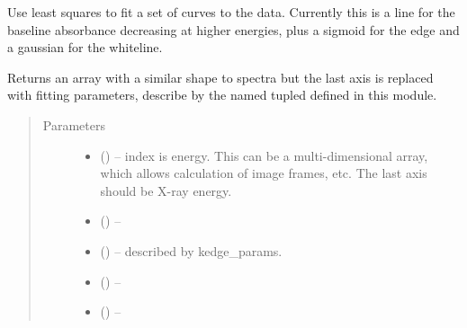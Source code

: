 \documentclass[letterpaper,10pt,english]{sphinxmanual}
\begin{document}
\begin{fulllineitems}
\label{\detokenize{xanespy:xanespy.xanes_math.fit_kedge}}
Use least squares to fit a set of curves to the data. Currently
this is a line for the baseline absorbance decreasing at higher
energies, plus a sigmoid for the edge and a gaussian for the
whiteline.

Returns an array with a similar shape to spectra but the last axis
is replaced with fitting parameters, describe by the named tupled
 defined in this module.
\begin{quote}\begin{description}
\item[{Parameters}] \leavevmode\begin{itemize}
\item {} 
 (\sphinxstyleliteralemphasis{-}) -- index is energy. This can be a multi-dimensional array, which
allows calculation of image frames, etc. The last axis should be
X-ray energy.

\item {} 
 (\sphinxstyleliteralemphasis{-}) -- 

\item {} 
 (\sphinxstyleliteralemphasis{-}) -- described by kedge\_params.

\item {} 
 (\sphinxstyleliteralemphasis{-}) -- 

\item {} 
 () -- 

\end{itemize}

\end{description}\end{quote}

\end{fulllineitems}

\end{document}
